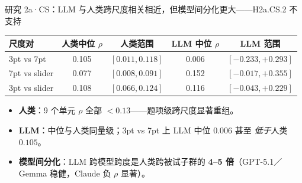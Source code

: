 \documentclass[aspectratio=169,professionalfonts]{beamer}
\begin{document}
\begin{frame}{研究 2a·CS：LLM 与人类跨尺度相关相近，但模型间分化更大——H2a.CS.2 不支持}
  \footnotesize
  \setlength{\tabcolsep}{4pt}
  \begin{table}
    \centering
    \begin{tabular}{lcccc}
      \toprule
      尺度对 & 人类中位 $\rho$ & 人类范围 & LLM 中位 $\rho$ & LLM 范围 \\
      \midrule
      3pt vs 7pt       & 0.105 & $[0.011, 0.118]$ & 0.006 & $[-0.233, +0.293]$ \\
      7pt vs slider    & 0.077 & $[0.008, 0.091]$ & 0.152 & $[-0.017, +0.355]$ \\
      3pt vs slider    & 0.108 & $[0.066, 0.124]$ & 0.116 & $[-0.043, +0.229]$ \\
      \bottomrule
    \end{tabular}
  \end{table}

  \begin{itemize}
    \small
    \item \textbf{人类}：9 个单元 $\rho$ 全部 $< 0.13$——题项级跨尺度显著重组。
    \item \textbf{LLM}：中位与人类同量级；3pt vs 7pt 上 LLM 中位 $0.006$ 甚至 \emph{低于}人类 $0.105$。
    \item \textbf{模型间分化}：LLM 跨模型跨度是人类跨被试子群的 \textbf{4--5 倍}（GPT-5.1／Gemma 稳健，Claude 负 $\rho$ 显著）。
  \end{itemize}
\end{frame}
\end{document}
